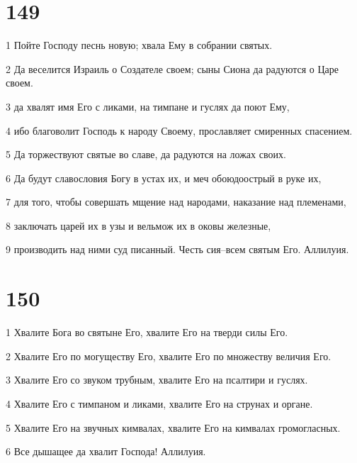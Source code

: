 \chapter{149}

\par 1 Пойте Господу песнь новую; хвала Ему в собрании святых.
\par 2 Да веселится Израиль о Создателе своем; сыны Сиона да радуются о Царе своем.
\par 3 да хвалят имя Его с ликами, на тимпане и гуслях да поют Ему,
\par 4 ибо благоволит Господь к народу Своему, прославляет смиренных спасением.
\par 5 Да торжествуют святые во славе, да радуются на ложах своих.
\par 6 Да будут славословия Богу в устах их, и меч обоюдоострый в руке их,
\par 7 для того, чтобы совершать мщение над народами, наказание над племенами,
\par 8 заключать царей их в узы и вельмож их в оковы железные,
\par 9 производить над ними суд писанный. Честь сия--всем святым Его. Аллилуия.

\chapter{150}

\par 1 Хвалите Бога во святыне Его, хвалите Его на тверди силы Его.
\par 2 Хвалите Его по могуществу Его, хвалите Его по множеству величия Его.
\par 3 Хвалите Его со звуком трубным, хвалите Его на псалтири и гуслях.
\par 4 Хвалите Его с тимпаном и ликами, хвалите Его на струнах и органе.
\par 5 Хвалите Его на звучных кимвалах, хвалите Его на кимвалах громогласных.
\par 6 Все дышащее да хвалит Господа! Аллилуия.


